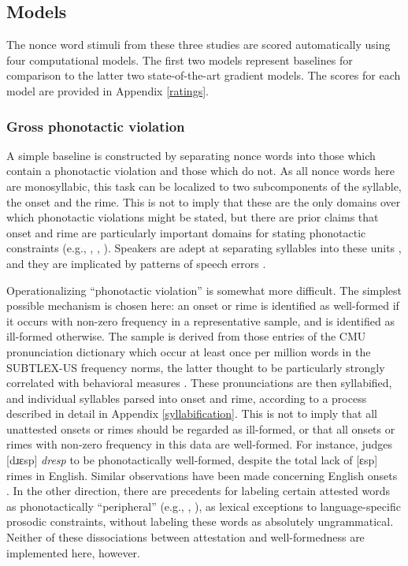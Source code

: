 \subsection{Models}

The nonce word stimuli from these three studies are scored automatically using four computational models. The first two models represent baselines for comparison to the latter two state-of-the-art gradient models. The scores for each model are provided in Appendix \ref{ratings}.

\subsubsection{Gross phonotactic violation}

A simple baseline is constructed by separating nonce words into those which contain a phonotactic violation and those which do not. As all nonce words here are monosyllabic, this task can be localized to two subcomponents of the syllable, the onset and the rime. This is not to imply that these are the only domains over which phonotactic violations might be stated, but there are prior claims that onset and rime are particularly important domains for stating phonotactic constraints (e.g., \citealt{Fudge1969}, \citealt{Kessler1997}, \citealt{Treiman2000}). Speakers are adept at separating syllables into these units \citep{Treiman1983,Treiman1986,Treiman1995}, and they are implicated by patterns of speech errors \citep{Fowler1987,Fowler1993}.

Operationalizing ``phonotactic violation'' is somewhat more difficult. The simplest possible mechanism is chosen here: an onset or rime is identified as well-formed if it occurs with non-zero frequency in a representative sample, and is identified as ill-formed otherwise. The sample is derived from those entries of the CMU pronunciation dictionary which occur at least once per million words in the SUBTLEX-US frequency norms, the latter thought to be particularly strongly correlated with behavioral measures \citep{Brysbaert2009}. These pronunciations are then syllabified, and individual syllables parsed into onset and rime, according to a process described in detail in Appendix \ref{syllabification}. This is not to imply that all unattested onsets or rimes should be regarded as ill-formed, or that all onsets or rimes with non-zero frequency in this data are well-formed. For instance, \citet{Albright2009a} judges [dɹɛsp] \emph{dresp} to be phonotactically well-formed, despite the total lack of [ɛsp] rimes in English. Similar observations have been made concerning English onsets \citep[e.g.,][]{Cairns1972,Moreton2002}. In the other direction, there are precedents for labeling certain attested words as phonotactically ``peripheral'' (e.g., \citealt{Myers1987}, \citealt{Borowsky1989}), as lexical exceptions to language-specific prosodic constraints, without labeling these words as absolutely ungrammatical. Neither of these dissociations between attestation and well-formedness are implemented here, however.


